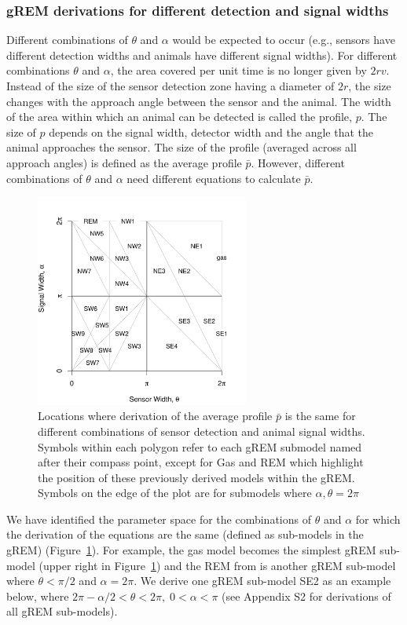 \documentclass[a4paper,10pt,reqno,oneside]{amsart}
\begin{document}
\subsubsection*{gREM derivations for different detection and signal widths}
Different combinations of $\theta$ and $\alpha$ would be expected to occur (e.g., sensors have different detection widths and animals have different signal widths). For different combinations $\theta$ and $\alpha$, the area covered per unit time is no longer given by $2rv$. Instead of the size of the sensor detection zone having a diameter of $2r$, the size changes with the approach angle between the sensor and the animal. The width of the area within which an animal can be detected is called the profile, $p$. The size of $p$ depends on the signal width, detector width and the angle that the animal approaches the sensor. The size of the profile (averaged across all approach angles) is defined as the average profile $\bar{p}$. However, different combinations of $\theta$ and $\alpha$ need different equations to calculate $\bar{p}$. 

\begin{figure}
\centering
\includegraphics[width=7cm]{imgs/equalRegions.pdf}
\caption{Locations where derivation of the average profile $\bar{p}$ is the same for different combinations of sensor detection and animal signal widths. Symbols within each polygon refer to each gREM submodel named after their compass point, except for Gas and REM which highlight the position of these previously derived models within the gREM. Symbols on the edge of the plot are for submodels where $\alpha, \theta = 2\pi$}
\label{f:equalRegions}
\end{figure}

We have identified the parameter space for the combinations of $\theta$ and $\alpha$ for which the derivation of the equations are the same (defined as sub-models in the gREM) (Figure~\ref{f:equalRegions}). For example, the gas model becomes the simplest gREM sub-model (upper right in Figure~\ref{f:equalRegions}) and the REM from \citet{rowcliffe2008estimating} is another gREM sub-model where $\theta<\pi/2$ and $\alpha = 2\pi$. We derive one gREM sub-model SE2 as an example below, where $2 \pi - \alpha/2 < \theta < 2\pi ,\; 0 < \alpha <\pi$ (see Appendix S2 for derivations of all gREM sub-models).
\end{document}
